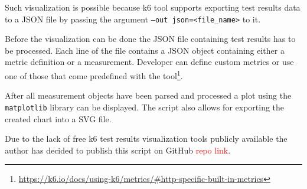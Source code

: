 \documentclass[12pt, a4paper]{article}
\newcommand\todo[1]{\textcolor{red}{#1}}
\begin{document}
Such visualization is possible because k6 tool supports exporting test results data to a JSON file by passing the argument \texttt{--out json=<file\_name>} to it.

Before the visualization can be done the JSON file containing test results has to be processed.
Each line of the file contains a JSON object containing either a metric definition or a measurement.
Developer can define custom metrics or use one of those that come predefined with the tool\footnote{\url{https://k6.io/docs/using-k6/metrics/#http-specific-built-in-metrics}}.

After all measurement objects have been parsed and processed a plot using the \texttt{matplotlib} library can be displayed.
The script also allows for exporting the created chart into a SVG file.

Due to the lack of free k6 test results visualization tools publicly available the author has decided to publish this script on GitHub \todo{repo link}.
\end{document}
